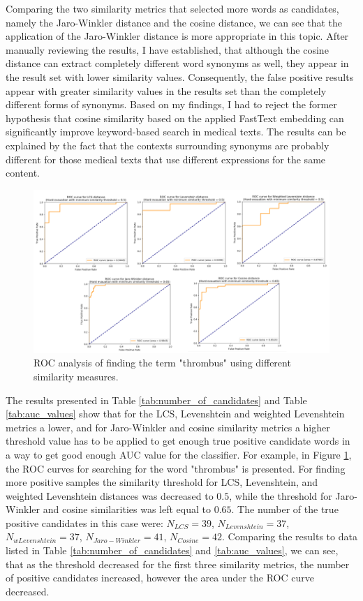 Comparing the two similarity metrics that selected more words as candidates, namely the Jaro-Winkler distance and the cosine distance, we can see that the application of the Jaro-Winkler distance is more appropriate in this topic. After manually reviewing the results, I have established, that although the cosine distance can extract completely different word synonyms as well, they appear in the result set with lower similarity values. Consequently, the false positive results appear with greater similarity values in the results set than the completely different forms of synonyms. Based on my findings, I had to reject the former hypothesis that cosine similarity based on the applied FastText embedding can significantly improve keyword-based search in medical texts. The results can be explained by the fact that the contexts surrounding synonyms are probably different for those medical texts that use different expressions for the same content.

\begin{figure}[h]
	\centering
        \captionsetup{justification=centering}
	\includegraphics[width=\textwidth]{assets/figures/text_mining/extraction/roc_results.png}
	\caption{ROC analysis of finding the term "thrombus" using different similarity measures.}
	\label{fig:roc_values}
\end{figure}

The results presented in Table \ref{tab:number_of_candidates} and Table \ref{tab:auc_values} show that for the LCS, Levenshtein and weighted Levenshtein metrics a lower, and for Jaro-Winkler and cosine similarity metrics a higher threshold value has to be applied to get enough true positive candidate words in a way to get good enough AUC value for the classifier. For example, in Figure \ref{fig:roc_values}, the ROC curves for searching for the word "thrombus" is presented. For finding more positive samples the similarity threshold for LCS, Levenshtein, and weighted Levenshtein distances was decreased to $0.5$, while the threshold for Jaro-Winkler and cosine similarities was left equal to $0.65$. The number of the true positive candidates in this case were: $N_{LCS}=39$, $N_{Levenshtein}=37$, $N_{wLevenshtein}=37$, $N_{Jaro-Winkler}=41$, $N_{Cosine}=42$. Comparing the results to data listed in Table \ref{tab:number_of_candidates} and \ref{tab:auc_values}, we can see, that as the threshold decreased for the first three similarity metrics, the number of positive candidates increased, however the area under the ROC curve decreased.

